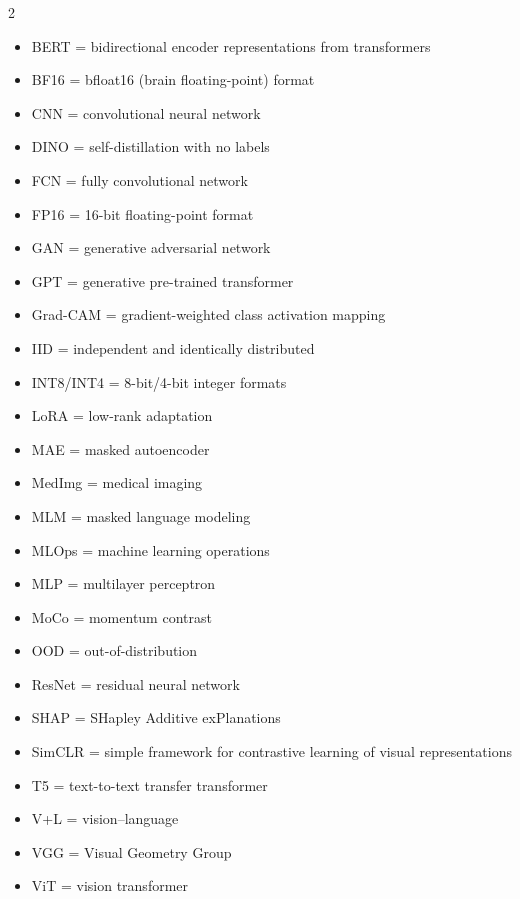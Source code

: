 \documentclass{article}
\begin{document}
\begin{multicols}{2}
    \begin{itemize}\setlength{\itemsep}{0cm}
        \item BERT = bidirectional encoder representations from transformers
        \item BF16 = bfloat16 (brain floating-point) format
        \item CNN = convolutional neural network
        \item DINO = self-distillation with no labels
        \item FCN = fully convolutional network
        \item FP16 = 16-bit floating-point format
        \item GAN = generative adversarial network
        \item GPT = generative pre-trained transformer
        \item Grad-CAM = gradient-weighted class activation mapping
        \item IID = independent and identically distributed
        \item INT8/INT4 = 8-bit/4-bit integer formats
        \item LoRA = low-rank adaptation
        \item MAE = masked autoencoder
        \item MedImg = medical imaging
        \item MLM = masked language modeling
        \item MLOps = machine learning operations
        \item MLP = multilayer perceptron
        \item MoCo = momentum contrast
        \item OOD = out-of-distribution
        \item ResNet = residual neural network
        \item SHAP = SHapley Additive exPlanations
        \item SimCLR = simple framework for contrastive learning of visual representations
        \item T5 = text-to-text transfer transformer
        \item V+L = vision--language
        \item VGG = Visual Geometry Group
        \item ViT = vision transformer
    \end{itemize}
\end{multicols}
\end{document}
